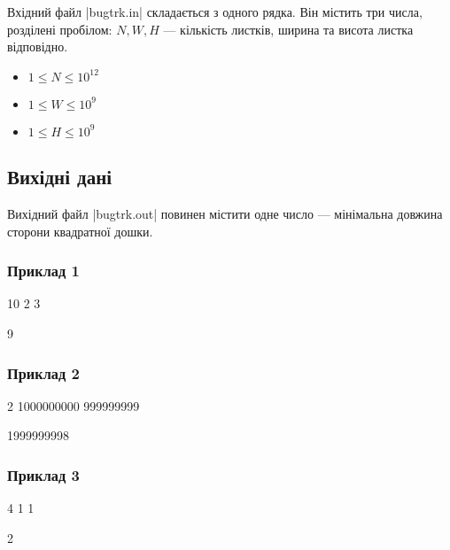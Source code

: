 \documentclass[12pt,a4paper]{article}
\begin{document}
Вхідний файл |bugtrk.in| складається з одного рядка.
Він містить три числа, розділені пробілом: \(N, W, H\) --- кількість листків, ширина та висота листка відповідно.

\begin{itemize}
    \item \(1 \leq N \leq 10^{12} \)
    \item \(1 \leq W \leq 10^{9} \)
    \item \(1 \leq H \leq 10^{9} \)
\end{itemize}


\subsection*{Вихідні дані}

Вихідний файл |bugtrk.out| повинен містити одне число --- мінімальна довжина сторони квадратної дошки.


\pagebreak


\subsubsection*{Приклад 1}

\textbf{}

\begin{codeblock}
10 2 3
\end{codeblock}

\textbf{}

\begin{codeblock}
9
\end{codeblock}


\subsubsection*{Приклад 2}

\textbf{}

\begin{codeblock}
2 1000000000 999999999
\end{codeblock}

\textbf{}

\begin{codeblock}
1999999998
\end{codeblock}


\subsubsection*{Приклад 3}

\textbf{}

\begin{codeblock}
4 1 1
\end{codeblock}

\textbf{}

\begin{codeblock}
2
\end{codeblock}
\end{document}
